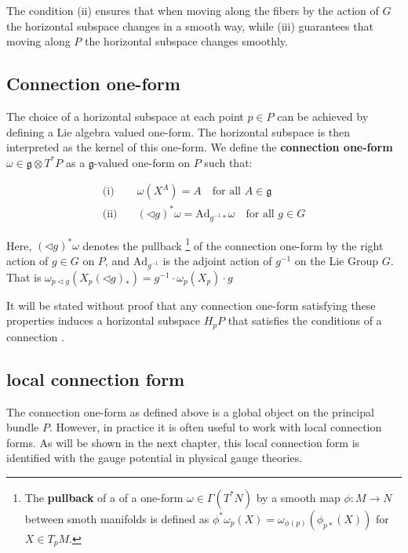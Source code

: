The condition (ii) ensures that when moving along the fibers by the action of \( G \) the horizontal subspace changes in a smooth way, while (iii) guarantees that moving along \( P \) the horizontal subspace changes smoothly.


\subsection{Connection one-form}

The choice of a horizontal subspace at each point \( p \in P \) can be achieved by defining a Lie algebra valued one-form. The horizontal subspace is then interpreted as the kernel of this one-form. We define the \textbf{connection one-form} \( \omega \in \mathfrak{g} \otimes T^*P \) as a \( \mathfrak{g} \)-valued one-form on \( P \) such that:

\begin{align*}
  \text{(i)}\quad 
    & \omega(X^A) = A \quad \text{for all } A \in \mathfrak{g} \\
  \text{(ii)}\quad 
    & (\triangleleft g)^* \omega = \text{Ad}_{g^{-1}*} \omega \quad \text{for all } g \in G 
\end{align*}

Here, \( (\triangleleft g)^* \omega \) denotes the pullback
\footnote{The \textbf{pullback} of a of a one-form \( \omega \in \Gamma(T^*N) \) by a smooth map \( \phi: M \rightarrow N \) between smoth manifolds is defined as \( \phi^* \omega_p(X) = \omega_{\phi(p)}(\phi_{p*}(X)) \) for \( X \in T_pM \).\cite{Pullbackdifferentialgeometry2024}}
of the connection one-form by the right action of \( g \in G \) on \( P \), and \( \text{Ad}_{g^{-1}} \) is the adjoint action of \( g^{-1} \) on the Lie Group \( G \). That is \( \omega_{p \triangleleft g}(X_p(\triangleleft g)_*) = g^{-1} \cdot \omega_p(X_p) \cdot g \)


It will be stated without proof that any connection one-form satisfying these properties induces a horizontal subspace \( H_pP \) that satisfies the conditions of a connection \cite{FredericSchullerConncectionsconnection1formsLec21FredericSchuller2015}.



\subsection{local connection form}

The connection one-form as defined above is a global object on the principal bundle \( P \). However, in practice it is often useful to work with local connection forms. As will be shown in the next chapter, this local connection form is identified with the gauge potential in physical gauge theories.

